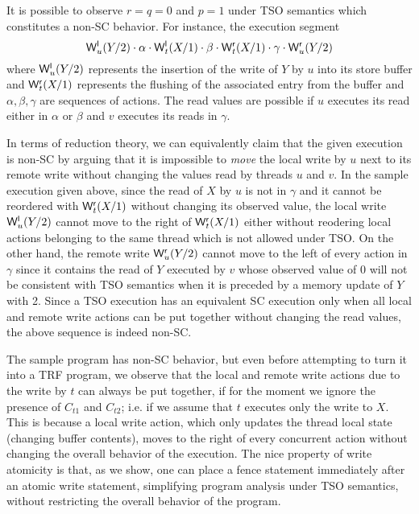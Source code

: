 \documentclass[preprint,9pt]{sigplanconf}
\begin{document}
It is possible to observe $r=q=0$ and $p=1$ under TSO semantics which constitutes a non-SC behavior.
For instance, the execution segment
\[
\mathsf{W}^{\mathsf{l}}_{u}(Y/2)\cdot \alpha\cdot \mathsf{W}^{\mathsf{l}}_{t}(X/1)\cdot \beta\cdot \mathsf{W}^{\mathsf{r}}_{t}(X/1)\cdot \gamma\cdot \mathsf{W}^{\mathsf{r}}_{u}(Y/2) 
\]
where $\mathsf{W}^{\mathsf{l}}_{u}(Y/2)$ represents the insertion of the write of $Y$ by $u$ into its store buffer and $\mathsf{W}^{\mathsf{r}}_{t}(X/1)$ represents the flushing of the associated entry from the buffer and $\alpha,\beta,\gamma$ are sequences of actions.
The read values are possible if $u$ executes its read either in $\alpha$ or $\beta$ and $v$ executes its reads in $\gamma$.

In terms of reduction theory, we can equivalently claim that the given execution is non-SC by arguing that it is impossible to {\em move} the local write by $u$ next to its remote write without changing the values read by threads $u$ and $v$.
In the sample execution given above, since the read of $X$ by $u$ is not in $\gamma$ and it cannot be reordered with $\mathsf{W}^{\mathsf{r}}_{t}(X/1)$ without changing its observed value, the local write $\mathsf{W}^{\mathsf{l}}_{u}(Y/2)$ cannot move to the right of $\mathsf{W}^{\mathsf{r}}_{t}(X/1)$ either without reodering local actions belonging to the same thread which is not allowed under TSO.
On the other hand, the remote write $\mathsf{W}^{\mathsf{r}}_{u}(Y/2)$ cannot move to the left of every action in $\gamma$ since it contains the read of $Y$ executed by $v$ whose observed value of 0 will not be consistent with TSO semantics when it is preceded by a memory update of $Y$ with 2. 
Since a TSO execution has an equivalent SC execution only when all local and remote write actions can be put together without changing the read values, the above sequence is indeed non-SC.

The sample program has non-SC behavior, but even before attempting to turn it into a TRF program, we observe that the local and remote write actions due to the write by $t$ can always be put together, if for the moment we ignore the presence of $C_{t1}$ and $C_{t2}$; i.e. if we assume that $t$ executes only the write to $X$.
This is because a local write action, which only updates the thread local state (changing buffer contents), moves to the right of every concurrent action without changing the overall behavior of the execution.
The nice property of write atomicity is that, as we show, one can place a fence statement immediately after an atomic write statement, simplifying program analysis under TSO semantics, without restricting the overall behavior of the program.
\end{document}
